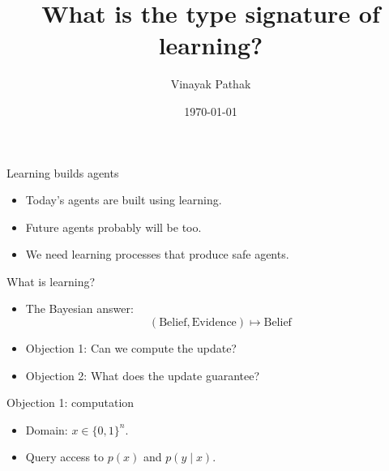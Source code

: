 \documentclass[11pt,aspectratio=169]{beamer}
\title{What is the type signature of learning?}
\author{Vinayak Pathak}
\date{\today}
\begin{document}
\begin{frame}
    \titlepage
\end{frame}

\begin{frame}{Learning builds agents}
\Large
\begin{itemize}[<+->]
    \item Today's agents are built using learning.
    \item Future agents probably will be too.
    \item We need learning processes that produce safe agents.
\end{itemize}
\end{frame}

\begin{frame}{What is learning?}
\Large
\begin{itemize}[<+->]
    \item The Bayesian answer:
    \[
        (\text{Belief},\text{Evidence})\longmapsto\text{Belief}
    \]
    \item Objection 1: Can we compute the update?
    \item Objection 2: What does the update guarantee?
\end{itemize}
\end{frame}

\begin{frame}{Objection 1: computation}
\large
\begin{itemize}
    \item<1-> Domain: $x\in\{0,1\}^n$.
    \item<2-> Query access to $p(x)$ and $p(y\mid x)$.
\end{itemize}
\end{frame}
\end{document}
